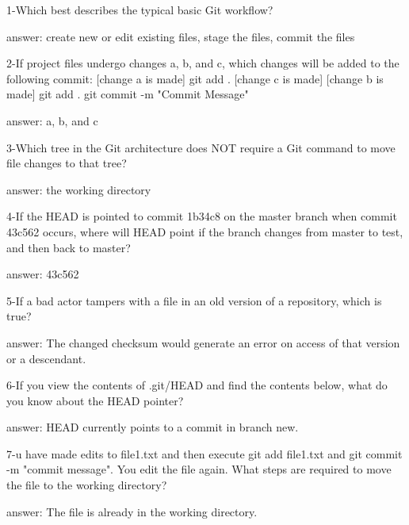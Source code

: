1-Which best describes the typical basic Git workflow?

answer: create new or edit existing files, stage the files, commit the files

2-If project files undergo changes a, b, and c, which changes will be added to the following commit: [change a is made] git add . [change c is made] [change b is made] git add . git commit -m "Commit Message"

answer: a, b, and c

3-Which tree in the Git architecture does NOT require a Git command to move file changes to that tree?

answer: the working directory

4-If the HEAD is pointed to commit 1b34c8 on the master branch when commit 43c562 occurs, where will HEAD point if the branch changes from master to test, and then back to master?

answer: 43c562

5-If a bad actor tampers with a file in an old version of a repository, which is true?

answer: The changed checksum would generate an error on access of that version or a descendant.

6-If you view the contents of .git/HEAD and find the contents below, what do you know about the HEAD pointer?

answer: HEAD currently points to a commit in branch new.

7-u have made edits to file1.txt and then execute git add file1.txt and git commit -m "commit message". You edit the file again. What steps are required to move the file to the working directory?

answer: The file is already in the working directory.
